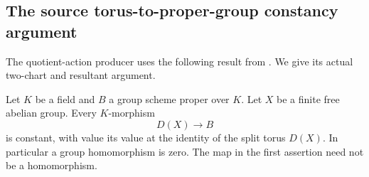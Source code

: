 \subsection{The source torus-to-proper-group constancy argument}
\label{subsec:faithful-torus-proper-constant}

The quotient-action producer uses the following result from
.  We give its actual
two-chart and resultant argument.

\begin{srlemma}\label{lem:faithful-torus-proper-constant}
Let \(K\) be a field and \(B\) a group scheme proper over \(K\).
Let \(X\) be a finite free abelian group.  Every \(K\)-morphism
\[
                         D(X)\longrightarrow B
\]
is constant, with value its value at the identity of the split
torus \(D(X)\).  In particular a group homomorphism is zero.
The map in the first assertion need not be a homomorphism.
\end{srlemma}
